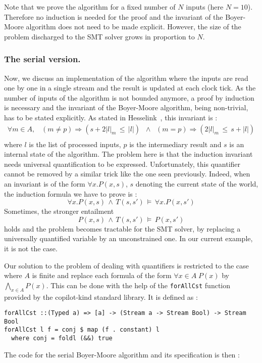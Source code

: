 Note that we prove the algorithm for a fixed number of $N$ inputs
(here $N=10$). Therefore no induction is needed for the proof and the
invariant of the Boyer-Moore algorithm does not need to be made explicit. However, the size of the problem discharged to the SMT solver grows in proportion to $N$.


\subsubsection{The serial version.} Now, we discuss an implementation
of the algorithm where the inputs are read one by one in a single
stream and the result is updated at each clock tick. As the number of
inputs of the algorithm is not bounded anymore, a proof by induction
is necessary and the invariant of the Boyer-Moore algorithm, being
non-trivial, has to be stated explicitly. As stated in
Hesselink~\cite{Hesselink2005}, this invariant is :
\[ \begin{array}{c}
\forall m \in A, \;\;\; \left(m \neq p\right) \Longrightarrow \left( s + 2|l|_m \,\leq\, |l| \right) \;\; \wedge \;\; \left(m = p\right) \Longrightarrow \left( 2|l|_m \,\leq\, s + |l| \right)
\\

\end{array} \]
where $l$ is the list of processed inputs, $p$ is the intermediary result and $s$ is an internal state of the algorithm. The problem here is that the induction invariant needs universal quantification to be expressed. Unfortunately, this quantifier cannot be removed by a similar trick like the one seen previously. Indeed, when an invariant is of the form $\forall x. P(x, s)$, $s$ denoting the current state of the world, the induction formula we have to prove is :
\[ \forall x. P(x, s) \,\wedge\, T\left(s, s' \right) \,\models\, \forall x. P(x, s') \]
Sometimes, the stronger entailment 
\[ P(x, s) \,\wedge\, T\left(s, s' \right) \,\models\, P(x, s') \]
holds and the problem becomes tractable for the SMT solver, by replacing a universally quantified variable by an unconstrained one. In our current example, it is not the case. 


Our solution to the problem of dealing with quantifiers is restricted to the
case where $A$ is finite and replace each formula of the form $\forall x \in A
\; P(x)$ by $\bigwedge_{x \in A} P(x)$. This can be done with the help of the
\texttt{forAllCst} function provided by the copilot-kind standard library. It is
defined as :
\begin{lstlisting}[frame=single]
forAllCst ::(Typed a) => [a] -> (Stream a -> Stream Bool) -> Stream Bool
forAllCst l f = conj $ map (f . constant) l
  where conj = foldl (&&) true
\end{lstlisting}
The code for the serial Boyer-Moore algorithm and its specification is then :

